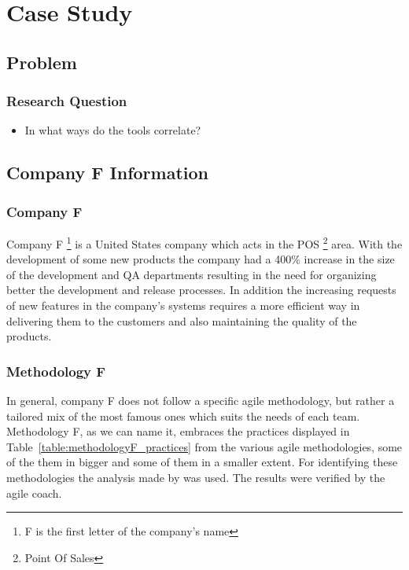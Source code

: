 \chapter{Case Study}
\label{ch:case_study}

\newcommand{\mysubparagraph}[1]{\subparagraph{#1}\mbox{}\\}

\section{Problem}

\subsection{Research Question}
\begin{itemize}
	\item In what ways do the tools correlate?
\end{itemize}

\section{Company F Information}

\subsection{Company F}
Company F \footnote{F is the first letter of the company's name} is a United States company which acts in the POS \footnote{Point Of Sales} area. With the development of some new products the company had a 400\% increase in the size of the development and QA departments resulting in the need for organizing better the development and release processes. In addition the increasing requests of new features in the company's systems requires a more efficient way in delivering them to the customers and also maintaining the quality of the products.

\subsection{Methodology F}
In general, company F does not follow a specific agile methodology, but rather a tailored mix of the most famous ones which suits the needs of each team. Methodology F, as we can name it, embraces the practices displayed in Table~\ref{table:methodologyF_practices} from the various agile methodologies, some of the them in bigger and some of them in a smaller extent. For identifying these methodologies the analysis made by \citet{koch2005agile} was used. The results were verified by the agile coach.

